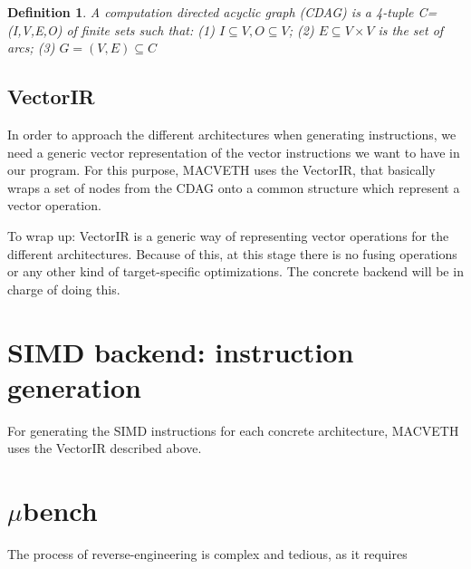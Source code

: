 \documentclass[a4paper,12pt]{memoir}
\newtheorem{definition}{Definition}[]
\begin{document}
\theoremstyle{definition}
\begin{definition}\label{def:CDAG}
	A computation directed acyclic graph (CDAG) is a 4-tuple C=(I,V,E,O) of 
	finite sets such that: (1) $I \subseteq V, O \subseteq V$; (2) $E 
	\subseteq V 
	\times V$ is the set of arcs; (3) $G=(V,E) \subseteq C$
\end{definition}


\section{VectorIR}
In order to approach the different architectures when generating instructions,
we need a generic vector representation of the vector instructions we want to
have in our program. For this purpose, MACVETH uses the VectorIR, that basically
wraps a set of nodes from the CDAG onto a common structure which represent a vector operation.

To wrap up: VectorIR is a generic way of representing vector operations for the different
architectures. Because of this, at this stage there is no fusing operations or
any other kind of target-specific optimizations. The concrete backend will be in
charge of doing this.

\chapter{SIMD backend: instruction generation}
For generating the SIMD instructions for each concrete architecture, MACVETH
uses the VectorIR described above.

\chapter{$\mu$bench}
The process of reverse-engineering is complex and tedious, as it requires



\end{document}
